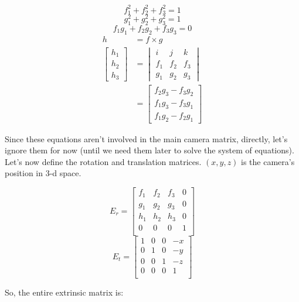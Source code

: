 \documentclass{article}
\begin{document}
$$
f_1^2 + f_2^2 + f_3^2 = 1
$$
$$
g_1^2 + g_2^2 + g_3^2 = 1
$$
$$
f_1 g_1 + f_2 g_2 + f_3 g_3 = 0
$$
\begin{align}
h &= f \times g \\
\begin{bmatrix}
h_1 \\
h_2 \\
h_3
\end{bmatrix} &= \begin{vmatrix}
i & j & k \\
f_1 & f_2 & f_3 \\
g_1 & g_2 & g_3
\end{vmatrix} \\
&= \begin{bmatrix}
f_2 g_3 - f_3 g_2 \\
f_1 g_3 - f_3 g_1 \\
f_1 g_2 - f_2 g_1
\end{bmatrix}
\end{align}

Since these equations aren't involved in the main camera matrix, directly, let's 
ignore them for now (until we need them later to solve the system of equations). 
Let's now define the rotation and translation matrices. $(x, y, z)$ is the 
camera's position in 3-d space.

$$
E_r = \begin{bmatrix}
f_1 & f_2 & f_3 & 0 \\
g_1 & g_2 & g_3 & 0 \\
h_1 & h_2 & h_3 & 0 \\
  0 &   0 &   0 & 1 \\
\end{bmatrix}
$$
$$
E_t = \begin{bmatrix}
1 & 0 & 0 & -x \\
0 & 1 & 0 & -y \\
0 & 0 & 1 & -z \\
0 & 0 & 0 &  1 \\
\end{bmatrix}
$$

So, the entire extrinsic matrix is:
\end{document}
